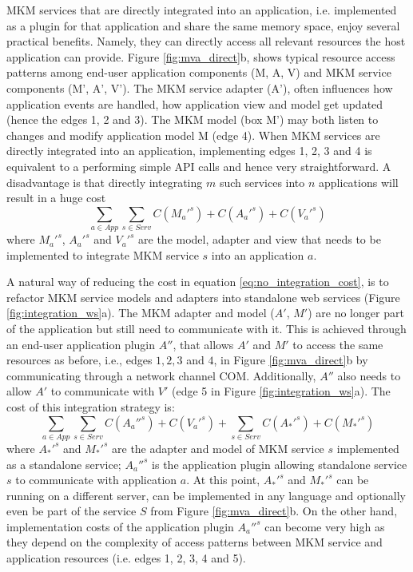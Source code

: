 \documentclass{llncs}
\begin{document}
MKM services that are directly integrated into an application, i.e. implemented as a plugin for that application and share the same memory space, enjoy several practical benefits. Namely, they can directly access all relevant resources the host application can provide. Figure \ref{fig:mva_direct}b, shows typical resource access patterns among end-user application components (M, A, V) and MKM service components (M', A', V'). The MKM service adapter (A'), often influences how application events are handled, how application view and model get updated (hence the edges 1, 2 and 3). The MKM model (box M') may both listen to changes and modify application model M (edge 4). When MKM services are directly integrated into an application, implementing edges 1, 2, 3 and 4 is equivalent to a performing simple API calls and hence very straightforward. A disadvantage is that directly integrating $m$ such services into $n$ applications will result in a huge cost 
\begin{equation}
\sum_{a\in App} \sum_{s \in Serv} C(M_a'^s)+C(A_a'^s)+C(V_a'^s)
\label{eq:no_integration_cost}
\end{equation}
where $M_a'^s$, $A_a'^s$ and $V_a'^s$ are the model, adapter and view that needs to be implemented to integrate MKM service $s$ into an application $a$. 

A natural way of reducing the cost in equation \ref{eq:no_integration_cost}, is to refactor MKM service models and adapters into standalone web services (Figure \ref{fig:integration_ws}a). The MKM adapter and model ($A'$, $M'$) are no longer part of the application but still need to communicate with it. This is achieved through an end-user application plugin $A''$, that allows $A'$ and $M'$ to access the same resources as before, i.e., edges $1, 2, 3$ and $4$, in Figure \ref{fig:mva_direct}b by communicating through a network channel COM. Additionally, $A''$ also needs to allow $A'$ to communicate with $V'$ (edge 5 in Figure \ref{fig:integration_ws}a). The cost of this integration strategy is:
\begin{equation}
\sum_{a\in App} \sum_{s \in Serv} C(A_a''^s)+C(V_a'^s) + \sum_{s \in Serv} C(A_{*}'^s) + C(M_{*}'^s)
\label{eq:refactor_integration_cost}
\end{equation}
where $A_{*}'^s$ and $M_{*}'^s$ are the adapter and model of MKM service $s$ implemented as a standalone service; $A_a''^s$ is the application plugin allowing standalone service $s$ to communicate with application $a$. At this point, $A_{*}'^s$ and $M_{*}'^s$ can be running on a different server, can be implemented in any language and optionally even be part of the service $S$ from Figure \ref{fig:mva_direct}b. On the other hand, implementation costs of the application plugin $A_a''^s$ can become very high as they depend on the complexity of access patterns between MKM service and application resources (i.e. edges 1, 2, 3, 4 and 5).
\end{document}
